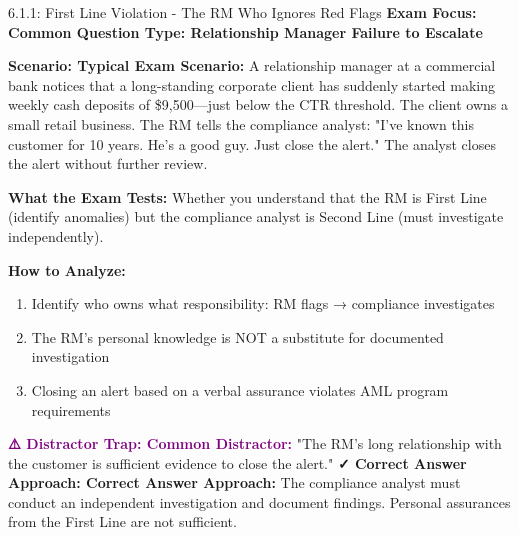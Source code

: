 \documentclass[11pt,a4paper]{beamer}
\newcommand{\examfocus}[1]{\textcolor{orange!80!black}{\textbf{Exam Focus: #1}}}
\newcommand{\trap}[1]{\textcolor{purple}{\textbf{⚠️ Distractor Trap: #1}}}
\newcommand{\correct}[1]{\textcolor{green!50!black}{\textbf{✓ Correct Answer Approach: #1}}}
\newcommand{\scenario}[1]{\textcolor{blue!70!black}{\textbf{Scenario: #1}}}
\begin{document}
	\begin{frame}{6.1.1: First Line Violation - The RM Who Ignores Red Flags}
		\examfocus{Common Question Type: Relationship Manager Failure to Escalate}
		
		\scenario{Typical Exam Scenario:}
		A relationship manager at a commercial bank notices that a long-standing corporate client has suddenly started making weekly cash deposits of \$9,500—just below the CTR threshold. The client owns a small retail business. The RM tells the compliance analyst: "I've known this customer for 10 years. He's a good guy. Just close the alert." The analyst closes the alert without further review.
		
		\textbf{What the Exam Tests:} Whether you understand that the RM is First Line (identify anomalies) but the compliance analyst is Second Line (must investigate independently).
		
		\textbf{How to Analyze:}
		\begin{enumerate}
			\item Identify who owns what responsibility: RM flags → compliance investigates
			\item The RM's personal knowledge is NOT a substitute for documented investigation
			\item Closing an alert based on a verbal assurance violates AML program requirements
		\end{enumerate}
		
		\trap{Common Distractor:} "The RM's long relationship with the customer is sufficient evidence to close the alert."
		\correct{Correct Answer Approach:} The compliance analyst must conduct an independent investigation and document findings. Personal assurances from the First Line are not sufficient.
	\end{frame}
	
\end{document}

